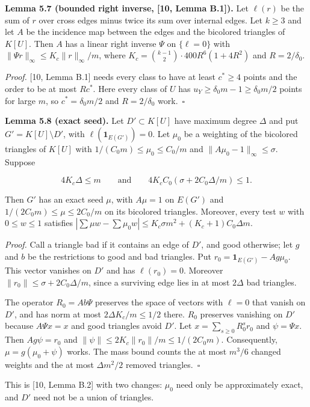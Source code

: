 \documentclass[english,11pt,a4paper]{article}
\begin{document}
\textbf{Lemma 5.7 (bounded right inverse, {[}10, Lemma B.1{]}).} Let \(\ell(r)\) be the sum of \(r\) over cross edges minus twice its sum over internal edges. Let \(k\ge3\) and let \(A\) be the incidence map between the edges and the bicolored triangles of \(K[U]\). Then \(A\) has a linear right inverse \(\Psi\) on \(\{\ell=0\}\) with \(\|\Psi r\|_\infty\le K_c\|r\|_\infty/m\), where \(K_c=\binom{k-1}{2}\cdot400R^6(1+4R^2)\) and \(R=2/\delta_0\).

\emph{Proof.} {[}10, Lemma B.1{]} needs every class to have at least \(c^*\ge4\) points and the order to be at most \(Rc^*\). Here every class of \(U\) has \(u_Y\ge\delta_0m-1\ge\delta_0m/2\) points for large \(m\), so \(c^*=\delta_0m/2\) and \(R=2/\delta_0\) work.~\(\square\)

\textbf{Lemma 5.8 (exact seed).} Let \(D'\subset K[U]\) have maximum degree \(\Delta\) and put \(G'=K[U]\setminus D'\), with \(\ell(\mathbf 1_{E(G')})=0\). Let \(\mu_0\) be a weighting of the bicolored triangles of \(K[U]\) with \(1/(C_0m)\le\mu_0\le C_0/m\) and \(\|A\mu_0-1\|_\infty\le\sigma\). Suppose

\nopagebreak[4]
\[4K_c\Delta\le m\qquad\text{and}\qquad4K_cC_0(\sigma+2C_0\Delta/m)\le1.\]

Then \(G'\) has an exact seed \(\mu\), with \(A\mu=1\) on \(E(G')\) and \(1/(2C_0m)\le\mu\le2C_0/m\) on its bicolored triangles. Moreover, every test \(w\) with \(0\le w\le1\) satisfies \(|\sum\mu w-\sum\mu_0w|\le K_c\sigma m^2+(K_c+1)C_0\Delta m\).

\emph{Proof.} Call a triangle bad if it contains an edge of \(D'\), and good otherwise; let \(g\) and \(b\) be the restrictions to good and bad triangles. Put \(r_0=\mathbf 1_{E(G')}-Ag\mu_0\). This vector vanishes on \(D'\) and has \(\ell(r_0)=0\). Moreover \(\|r_0\|\le\sigma+2C_0\Delta/m\), since a surviving edge lies in at most \(2\Delta\) bad triangles.

The operator \(R_0=Ab\Psi\) preserves the space of vectors with \(\ell=0\) that vanish on \(D'\), and has norm at most \(2\Delta K_c/m\le1/2\) there. \(R_0\) preserves vanishing on \(D'\) because \(A\Psi x=x\) and good triangles avoid \(D'\). Let \(x=\sum_{s\ge0}R_0^sr_0\) and \(\psi=\Psi x\). Then \(Ag\psi=r_0\) and \(\|\psi\|\le2K_c\|r_0\|/m\le1/(2C_0m)\). Consequently, \(\mu=g(\mu_0+\psi)\) works. The mass bound counts the at most \(m^3/6\) changed weights and the at most \(\Delta m^2/2\) removed triangles.~\(\square\)

This is {[}10, Lemma B.2{]} with two changes: \(\mu_0\) need only be approximately exact, and \(D'\) need not be a union of triangles.
\end{document}
